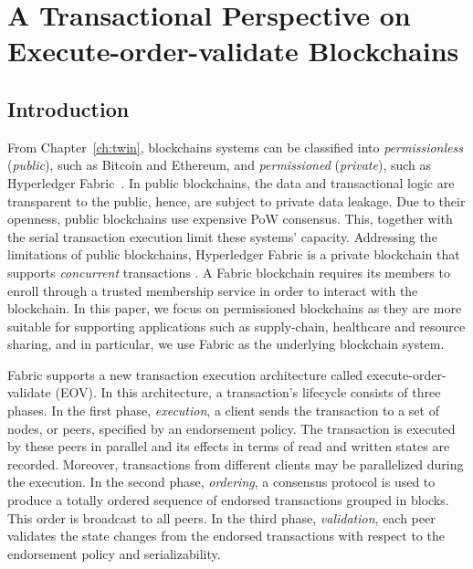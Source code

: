 \chapter{A Transactional Perspective on \\Execute-order-validate Blockchains}
\label{ch:txn}
\section{Introduction}
\label{sec:txn:intro}
From Chapter~\ref{ch:twin}, blockchains systems can be classified into \textit{permissionless}
(\textit{public}), such as Bitcoin and Ethereum, and \textit{permissioned}
(\textit{private}), such as Hyperledger Fabric~\cite{androulaki2018hyperledger}.
%
In public blockchains, the data and transactional logic are transparent to the
public, hence, are subject to private data leakage.
%
Due to their openness, public blockchains use expensive PoW consensus.
%
This, together with the serial transaction execution limit these systems' capacity.
%
Addressing the limitations of public blockchains, Hyperledger Fabric is a
private blockchain that supports \emph{concurrent} transactions
\cite{androulaki2018hyperledger}.
%
A Fabric blockchain requires its members to enroll through a trusted membership service in order to interact with the blockchain.
In this paper, we focus on permissioned blockchains as they are more suitable
for supporting applications such as supply-chain, healthcare and resource
sharing, and in particular, we use Fabric as the underlying blockchain system.

Fabric supports a new transaction execution architecture called
execute-order-validate (EOV).
%
In this architecture, a transaction's lifecycle consists of three phases. In the
first phase, \textit{execution}, a client sends the transaction to a set of
nodes, or peers, specified by an endorsement policy.
%
The transaction is executed by these peers in parallel and its effects in terms
of read and written states are recorded.
%
Moreover, transactions from different clients may be parallelized during the
execution.
%
In the second phase, \textit{ordering}, a consensus protocol is used
to produce a totally ordered sequence of endorsed transactions grouped in
blocks.
%
This order is broadcast to all peers. In the third phase, \textit{validation},
each peer validates the state changes from the endorsed transactions with
respect to the endorsement policy and serializability.

